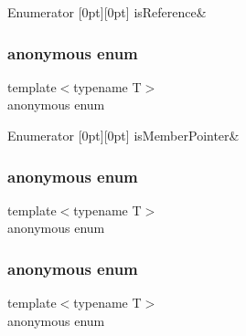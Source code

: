 \begin{DoxyEnumFields}{Enumerator}
[0pt][0pt]{}\mbox{\label{classUtil_1_1TypeTraits_a0839bb273e8995e087dfec963f330b46ac0cdaf0e77f765430820e96bb7cf4619}} 
is\+Reference&\\
\hline

\end{DoxyEnumFields}
\mbox{\label{classUtil_1_1TypeTraits_a4a679932597f0e7cbaffd7d78f489370}} 
\subsubsection{\texorpdfstring{anonymous enum}{anonymous enum}}
{\footnotesize\ttfamily template$<$typename T$>$ \\
anonymous enum}

\begin{DoxyEnumFields}{Enumerator}
[0pt][0pt]{}\mbox{\label{classUtil_1_1TypeTraits_aee8735f108bb235c2d59b8b823e04086abe04caa758890fee25930d96123265d2}} 
is\+Member\+Pointer&\\
\hline

\end{DoxyEnumFields}
\mbox{\label{classUtil_1_1TypeTraits_adf75966e5c80b924ada64ef7840c9153}} 
\subsubsection{\texorpdfstring{anonymous enum}{anonymous enum}}
{\footnotesize\ttfamily template$<$typename T$>$ \\
anonymous enum}

\mbox{\label{classUtil_1_1TypeTraits_ac0aa2e6981457a1212416a322aa33e6b}} 
\subsubsection{\texorpdfstring{anonymous enum}{anonymous enum}}
{\footnotesize\ttfamily template$<$typename T$>$ \\
anonymous enum}

